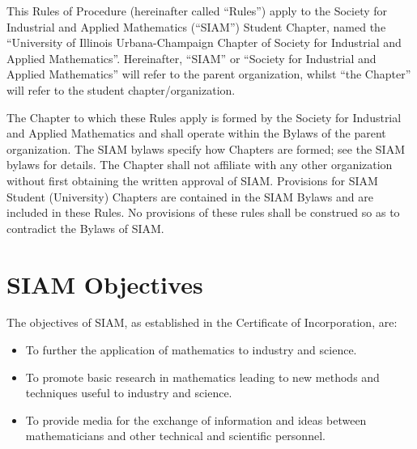 \documentclass{ronr-bylaws}
\author{Nicolas Nytko}
\date{\today}
\begin{document}
%
%
\maketitlepage
%
%
\tableofcontents
\newpage
%
\maketitle
This Rules of Procedure (hereinafter called ``Rules'') apply to the Society for Industrial and Applied Mathematics (``SIAM'') Student Chapter, named the ``University of Illinois Urbana-Champaign Chapter of Society for Industrial and Applied Mathematics''.  Hereinafter, ``SIAM'' or ``Society for Industrial and Applied Mathematics'' will refer to the parent organization, whilst ``the Chapter'' will refer to the student chapter/organization.

The Chapter to which these Rules apply is formed by the Society for Industrial and Applied
Mathematics and shall operate within the Bylaws of the parent organization. The SIAM bylaws
specify how Chapters are formed; see the SIAM bylaws for details. The Chapter shall not affiliate
with any other organization without first obtaining the written approval of SIAM. Provisions for
SIAM  Student (University) Chapters are contained in the SIAM Bylaws and are included in these
Rules. No provisions of these rules shall be construed so as to contradict the Bylaws of SIAM.
\section{SIAM Objectives}
The objectives of SIAM, as established in the Certificate of Incorporation, are:
\begin{itemize}
\item To further the application of mathematics to industry and science.
\item To promote basic research in mathematics leading to new methods and techniques useful to industry and science.
\item To provide media for the exchange of information and ideas between mathematicians and other technical and scientific personnel.
\end{itemize}
\end{document}
